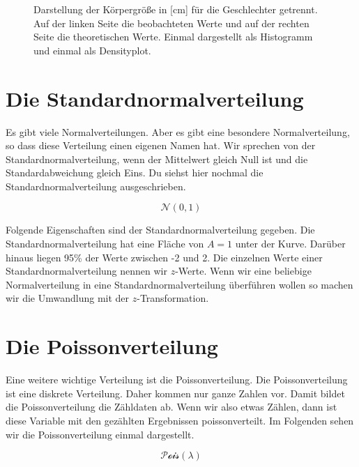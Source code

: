 \documentclass[
  letterpaper,
]{scrbook}
\begin{document}
\begin{figure}
\begin{minipage}[t]{0.50\linewidth}
{{}

}

\end{minipage}%

\caption{\label{fig-normal-03}Darstellung der Körpergröße in {[}cm{]}
für die Geschlechter getrennt. Auf der linken Seite die beobachteten
Werte und auf der rechten Seite die theoretischen Werte. Einmal
dargestellt als Histogramm und einmal als Densityplot.}

\end{figure}

\hypertarget{die-standardnormalverteilung}{%
\section{Die
Standardnormalverteilung}\label{die-standardnormalverteilung}}

Es gibt viele Normalverteilungen. Aber es gibt eine besondere
Normalverteilung, so dass diese Verteilung einen eigenen Namen hat. Wir
sprechen von der Standardnormalverteilung, wenn der Mittelwert gleich
Null ist und die Standardabweichung gleich Eins. Du siehst hier nochmal
die Standardnormalverteilung ausgeschrieben.

\[
\mathcal{N}(0, 1)
\]

Folgende Eigenschaften sind der Standardnormalverteilung gegeben. Die
Standardnormalverteilung hat eine Fläche von \(A = 1\) unter der Kurve.
Darüber hinaus liegen 95\% der Werte zwischen -2 und 2. Die einzelnen
Werte einer Standardnormalverteilung nennen wir \(z\)-Werte. Wenn wir
eine beliebige Normalverteilung in eine Standardnormalverteilung
überführen wollen so machen wir die Umwandlung mit der
\(z\)-Transformation.

\hypertarget{sec-poisson}{%
\section{Die Poissonverteilung}\label{sec-poisson}}

Eine weitere wichtige Verteilung ist die Poissonverteilung. Die
Poissonverteilung ist eine diskrete Verteilung. Daher kommen nur ganze
Zahlen vor. Damit bildet die Poissonverteilung die Zähldaten ab. Wenn
wir also etwas Zählen, dann ist diese Variable mit den gezählten
Ergebnissen poissonverteilt. Im Folgenden sehen wir die
Poissonverteilung einmal dargestellt.

\[
\mathcal{Pois}(\lambda)
\]
\end{document}
